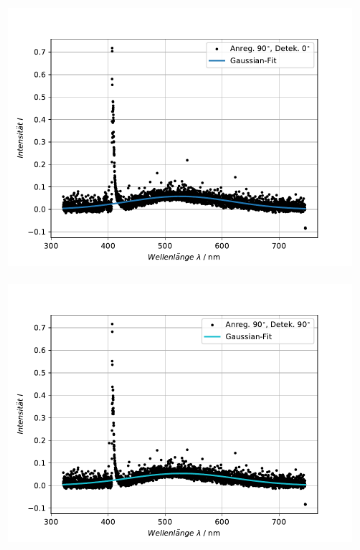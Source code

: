 \begin{figure}[hbtp]
\begin{subfigure}[t]{0.45\textwidth}
	\end{subfigure}
	\\
	\begin{subfigure}[t]{0.45\textwidth}
	\includegraphics[width=\textwidth]{Plots/aufgabe3_P3.pdf}
	\end{subfigure}
	\begin{subfigure}[t]{0.45\textwidth}
	\includegraphics[width=\textwidth]{Plots/aufgabe3_P4.pdf}
	\end{subfigure}
\label{abb:auf3}
\end{figure}


